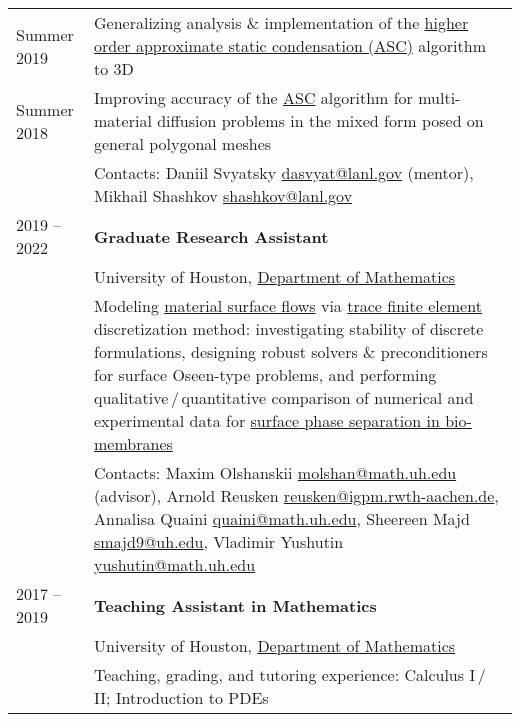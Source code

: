 \documentclass[a4paper,12pt]{article}
\begin{document}
\begin{longtable}{ l >{\raggedright\arraybackslash}p{15cm} }
		Summer 2019
			& Generalizing analysis \& implementation of the \href{https://www.researchgate.net/publication/330912268_A_higher_order_approximate_static_condensation_method_for_multi-material_diffusion_problems}{higher order approximate static condensation (ASC)} algorithm to 3D\vspace{1mm}\\
		Summer 2018
			& Improving accuracy of the \href{https://www.researchgate.net/publication/318300724_Approximate_static_condensation_algorithm_for_solving_multi-material_diffusion_problems_on_meshes_non-aligned_with_material_interfaces}{ASC} algorithm for multi-material diffusion problems in the mixed form posed on general polygonal meshes\vspace{1mm}\\
			& Contacts: Daniil Svyatsky \href{mailto:dasvyat@lanl.gov}{dasvyat@lanl.gov} (mentor), Mikhail Shashkov \href{mailto:shashkov@lanl.gov}{shashkov@lanl.gov}\vspace{3mm}\\			
		2019 -- 2022
			& \textbf{Graduate Research Assistant}\vspace{1mm}\\
			& University of Houston, \href{http://www.uh.edu/nsm/math/}{Department of Mathematics}\vspace{1mm}\\
			& Modeling \href{https://www.math.uh.edu/~molshan/maniflows.html}{material surface flows} via \href{https://www.math.uh.edu/~molshan/tracefinite.html}{trace finite element} discretization method: investigating stability of discrete formulations, designing robust solvers \& preconditioners for surface Oseen-type problems, and performing qualitative\,/\,quantitative comparison of numerical and experimental data for \href{https://www.math.uh.edu/~molshan/material.html}{surface phase separation in bio-membranes}\vspace{1mm}\\
			& Contacts: Maxim Olshanskii \href{mailto:molshan@math.uh.edu}{molshan@math.uh.edu} (advisor), Arnold Reusken \href{mailto:reusken@igpm.rwth-aachen.de}{reusken@igpm.rwth-aachen.de}, Annalisa Quaini \href{mailto:quaini@math.uh.edu}{quaini@math.uh.edu}, Sheereen Majd \href{mailto:smajd9@uh.edu}{smajd9@uh.edu}, Vladimir Yushutin \href{mailto:yushutin@math.uh.edu}{yushutin@math.uh.edu}\vspace{3mm}\\
		2017 -- 2019
			& \textbf{Teaching Assistant in Mathematics}\vspace{1mm}\\
			& University of Houston, \href{http://www.uh.edu/nsm/math/}{Department of Mathematics}\vspace{1mm}\\
			& Teaching, grading, and tutoring experience: Calculus I\,/\,II; Introduction to PDEs
	\end{longtable}
\end{document}

